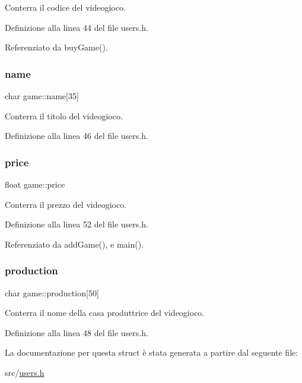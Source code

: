 Conterra\textquotesingle{} il codice del videogioco. 



Definizione alla linea 44 del file users.\+h.



Referenziato da buy\+Game().

\mbox{\label{structgame_a6a9fb0917f60e741c09f7955feccfd7d}} 
\subsubsection{\texorpdfstring{name}{name}}
{\footnotesize\ttfamily char game\+::name\mbox{[}35\mbox{]}}



Conterra\textquotesingle{} il titolo del videogioco. 



Definizione alla linea 46 del file users.\+h.

\mbox{\label{structgame_ae1753fa006ae874f813b8e52f5530c86}} 
\subsubsection{\texorpdfstring{price}{price}}
{\footnotesize\ttfamily float game\+::price}



Conterra\textquotesingle{} il prezzo del videogioco. 



Definizione alla linea 52 del file users.\+h.



Referenziato da add\+Game(), e main().

\mbox{\label{structgame_a21702a02fe973a0e76d0976c4aa2e7b5}} 
\subsubsection{\texorpdfstring{production}{production}}
{\footnotesize\ttfamily char game\+::production\mbox{[}50\mbox{]}}



Conterra\textquotesingle{} il nome della casa produttrice del videogioco. 



Definizione alla linea 48 del file users.\+h.



La documentazione per questa struct è stata generata a partire dal seguente file\+:\begin{DoxyCompactItemize}
\item 
src/\hyperlink{users_8h}{users.\+h}\end{DoxyCompactItemize}
